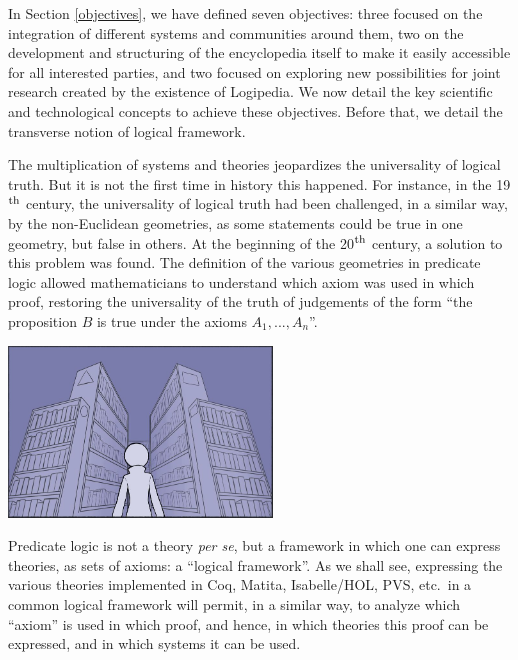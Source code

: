 
In Section \ref{objectives}, we have defined seven objectives: three
focused on the integration of different systems and communities around
them, two on the development and structuring of the encyclopedia
itself to make it easily accessible for all interested parties, and
two focused on exploring new possibilities for joint research created
by the existence of Logipedia. We now detail the key scientific and
technological concepts to achieve these objectives.  Before that, we
detail the transverse notion of logical framework.


The multiplication of systems and theories jeopardizes the
universality of logical truth. But it is not the first time in history
this happened.  For instance, in the 19$^{\mbox{\footnotesize th}}$
century, the universality of logical truth had been challenged, in a
similar way, by the non-Euclidean geometries, as some statements could
be true in one geometry, but false in others. At the beginning of the
20$^{\mbox{\footnotesize th}}$ century, a solution to this problem was
found.  The definition of the various geometries in predicate logic
\cite{HilbertAckermann} allowed mathematicians to understand which
axiom was used in which proof, restoring the universality of the truth
of judgements of the form ``the proposition $B$ is true under the
axioms $A_1, ..., A_n$''.

\begin{center}
\includegraphics[width=7cm]{img/Illustration4-reduced.jpg}
\end{center}

Predicate logic is not a theory {\em per se}, but a framework in
which one can express theories, as sets of axioms: a ``logical
framework''. As we shall see, expressing the various theories
implemented in Coq, Matita, Isabelle/HOL, PVS, etc.\ in a common
logical framework will permit, in a similar way, to analyze which
``axiom'' is used in which proof, and hence, in which theories this
proof can be expressed, and in which systems it can be used.

